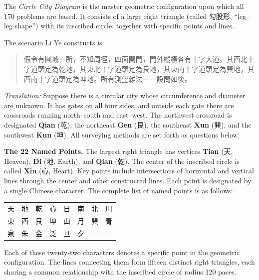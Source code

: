 \documentclass[11pt,a4paper]{article}
\begin{document}
The \textit{Circle City Diagram} is the master geometric configuration upon which all 170 problems are based. It consists of a large right triangle (called 勾股形, ``leg--leg shape'') with its inscribed circle, together with specific points and lines.

The scenario Li Ye constructs is:

\begin{quote}
假令有圓城一所，不知周徑，四面開門，門外縱橫各有十字大道。其西北十字道頭定為乾地，其東北十字道頭定為艮地，其東南十字道頭定為巽地，其西南十字道頭定為坤地。所有測望雜法一一設問如後。
\end{quote}

\textit{Translation:} Suppose there is a circular city whose circumference and diameter are unknown. It has gates on all four sides, and outside each gate there are crossroads running north--south and east--west. The northwest crossroad is designated \textbf{Qian} (乾), the northeast \textbf{Gen} (艮), the southeast \textbf{Xun} (巽), and the southwest \textbf{Kun} (坤). All surveying methods are set forth as questions below.

\vspace{0.3cm}

\textbf{The 22 Named Points.} The largest right triangle has vertices \textbf{Tian} (天, Heaven), \textbf{Di} (地, Earth), and \textbf{Qian} (乾). The center of the inscribed circle is called \textbf{Xin} (心, Heart). Key points include intersections of horizontal and vertical lines through the center and other constructed lines. Each point is designated by a single Chinese character. The complete list of named points is as follows:

\begin{center}
\begin{tabular}{llllllll}
\toprule
天 & 地 & 乾 & 心 & 日 & 南 & 北 & 川 \\
東 & 西 & 艮 & 坤 & 山 & 月 & 巽 & 青 \\
泉 & 朱 & 金 & 泛 & 旦 & 夕 & & \\
\bottomrule
\end{tabular}
\end{center}

Each of these twenty-two characters denotes a specific point in the geometric configuration. The lines connecting them form fifteen distinct right triangles, each sharing a common relationship with the inscribed circle of radius 120 paces.

\vspace{0.3cm}
\end{document}
